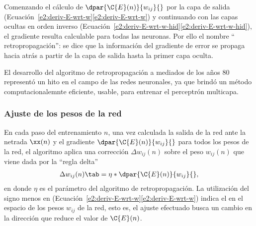 Comenzando el cálculo de $\dpar{\C{E}(n)}{w_{ij}}{}$ por la capa de
salida
(\iflatexml{}Ecuación~\ref{e2:deriv-E-wrt-w}\else\autoref{e2:deriv-E-wrt-w}\fi)
y continuando con las capas ocultas en orden inverso
(\iflatexml{}Ecuación~\ref{e2:deriv-E-wrt-w-hid}\else\autoref{e2:deriv-E-wrt-w-hid}\fi),
el gradiente resulta calculable para todas las neuronas.  Por ello el
nombre `` retropropagación'': se dice que la información del gradiente
de error se propaga hacia atrás a partir de la capa de salida hasta la
primer capa oculta.

El desarrollo del algoritmo de retropropagación a mediados de los años
80 representó un hito en el campo de las redes neuronales, ya
que brindó un método computacionalemnte eficiente, usable, para
entrenar el perceptrón multicapa.
%
\subsubsection{Ajuste de los pesos de la red}
%
En cada paso del entrenamiento $n$, una vez calculada la salida de la
red ante la netrada $\xx(n)$ y el gradiente
$\dpar{\C{E}(n)}{w_{ij}}{}$ para todos los pesos de la red, el
algoritmo aplica una corrección $\Delta{}w_{ij}(n)$ sobre el peso
$w_{ij}(n)$ que viene dada por la ``regla delta''
%
\begin{align}\label{e2:delta-rule}
  \Delta w_{ij}(n)\tab=\eta *\dpar{\C{E}(n)}{w_{ij}}{},
\end{align}
%
en donde $\eta$ es el parámetro  del
algoritmo de retropropagación. La utilización del signo menos en
(\iflatexml{}Ecuación~\ref{e2:deriv-E-wrt-w}\else\autoref{e2:deriv-E-wrt-w}\fi)
indica el  en el espacio de los pesos
$w_{ij}$ de la red, esto es, el ajuste efectuado busca un cambio en la
dirección que reduce el valor de $\C{E}(n)$.
%
